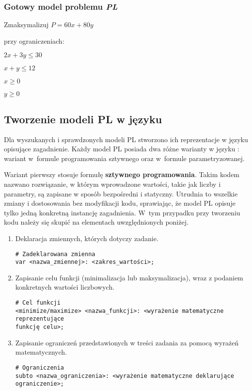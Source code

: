 \subsubsection*{Gotowy model problemu \textit{PL}}
    Zmaksymalizuj $P = 60x + 80y$

przy ograniczeniach:

    $2x + 3y \leq 30$
    
    $x + y \leq 12$
    
    $x  \geq 0$
    
    $y \geq 0$


\subsection{Tworzenie modeli PL w języku }

Dla wyszukanych i sprawdzonych modeli PL stworzono ich reprezentacje w języku  opisujące zagadnienie. %
Każdy model PL posiada dwa różne warianty w języku  : wariant w~formule programowania sztywnego oraz w~formule parametryzowanej. %

Wariant pierwszy stosuje formułę \textbf{sztywnego programowania}. Takim kodem nazwano rozwiązanie, w którym wprowadzone wartości, takie jak liczby i parametry, są zapisane w sposób bezpośredni i statyczny. Utrudnia to wszelkie zmiany i dostosowania bez modyfikacji kodu, sprawiając, że model PL opisuje tylko jedną konkretną instancję zagadnienia. W~tym przypadku przy tworzeniu kodu   należy się skupić na elementach uwzględnionych poniżej.

\begin{enumerate}
\item Deklaracja zmiennych, których dotyczy zadanie.

\begin{lstlisting}[language=zimpl]
# Zadeklarowana zmienna
var <nazwa_zmiennej>: <zakres_wartości>;
\end{lstlisting}

\item Zapisanie celu funkcji (minimalizacja lub maksymalizacja), wraz z podaniem konkretnych wartości liczbowych.

\begin{lstlisting}[language=zimpl]
# Cel funkcji
<minimize/maximize> <nazwa_funkcji>: <wyrażenie matematyczne reprezentujące
funkcję celu>;
\end{lstlisting}

\item Zapisanie ograniczeń przedstawionych w treści zadania za pomocą wyrażeń matematycznych.

\begin{lstlisting}[language=zimpl]
# Ograniczenia
subto <nazwa_ograniczenia>: <wyrażenie matematyczne deklarujące ograniczenie>;
\end{lstlisting}
\end{enumerate}

